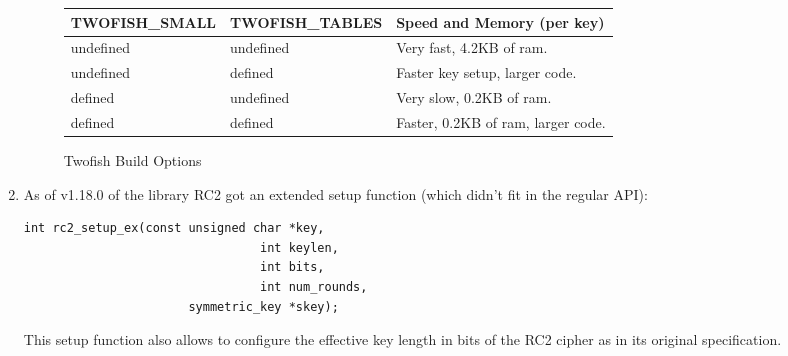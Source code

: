 \documentclass[synpaper]{book}
\begin{document}
\begin{small}
\begin{enumerate}
\begin{figure}[hpbt]
  
\begin{small}
\begin{center}
\begin{tabular}{|l|l|l|}
\hline \textbf{TWOFISH\_SMALL} & \textbf{TWOFISH\_TABLES} & \textbf{Speed and Memory (per key)} \\
\hline undefined & undefined & Very fast, 4.2KB of ram. \\
\hline undefined & defined & Faster key setup, larger code. \\
\hline defined & undefined & Very slow, 0.2KB of ram. \\
\hline defined & defined & Faster, 0.2KB of ram, larger code. \\
\hline
\end{tabular}
\end{center}
\end{small}
\caption{Twofish Build Options}
\label{fig:twofishopts}
\end{figure}

\item
As of v1.18.0 of the library RC2 got an extended setup function (which didn't fit in the regular API):

\begin{verbatim}
int rc2_setup_ex(const unsigned char *key,
                                 int keylen,
                                 int bits,
                                 int num_rounds,
                       symmetric_key *skey);
\end{verbatim}

This setup function also allows to configure the effective key length in bits of the RC2 cipher as in its original specification.

\end{enumerate}
\end{small}
\end{document}

